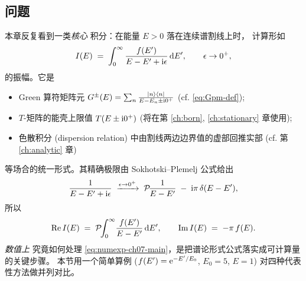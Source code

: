 \subsection*{问题}
本章反复看到一类\emph{核心} 积分：在能量 $E>0$ 落在连续谱割线上时，
计算形如
\begin{equation}\label{eq:numexp-ch07-main}
  I(E)\;=\;\int_0^\infty\frac{f(E')}{E-E'+\mathrm{i}\epsilon}\,\mathrm{d} E',
  \qquad \epsilon \to 0^+,
\end{equation}
的振幅。它是
\begin{itemize}
  \item Green 算符矩阵元 $G^\pm(E)=\sum_n\frac{\ket{n}\bra{n}}{E-E_n\pm\mathrm{i} 0^+}$
        (cf. \eqref{eq:Gpm-def});
  \item $T$-矩阵的能壳上限值 $T(E\pm\mathrm{i} 0^+)$ (将在第 \ref{ch:born}, \ref{ch:stationary} 章使用);
  \item 色散积分 (dispersion relation) 中由割线两边边界值的虚部回推实部
        (cf. 第 \ref{ch:analytic} 章)
\end{itemize}
等场合的统一形式。其精确极限由 Sokhotski--Plemelj 公式给出
\begin{equation}\label{eq:numexp-ch07-SP}
  \frac{1}{E-E'+\mathrm{i}\epsilon}\;\xrightarrow{\epsilon\to 0^+}\;
  \mathcal P\!\frac{1}{E-E'} \;-\;\mathrm{i}\pi\,\delta(E-E'),
\end{equation}
所以
\begin{equation}
  \Re I(E) \;=\; \mathcal P\!\!\int_0^\infty\!\frac{f(E')}{E-E'}\,\mathrm{d} E',
  \qquad
  \Im I(E) \;=\; -\pi\,f(E).
\end{equation}
\emph{数值上} 究竟如何处理 \eqref{eq:numexp-ch07-main}，是把谱论形式公式落实成可计算量的关键步骤。
本节用一个简单算例 ($f(E')=\mathrm{e}^{-E'/E_0}$, $E_0=5$, $E=1$)
对四种代表性方法做并列对比。

